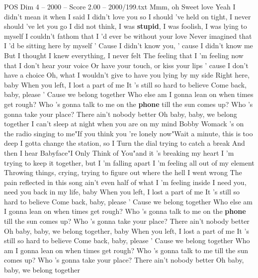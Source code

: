 \begin{textsample}{POS Dim 4 – 2000 – Score 2.00 – 2000/199.txt}  \label{ex:f4_pos_005}
Mmm, oh Sweet love Yeah I didn't mean it when I said I didn't love you so I should 've held on tight, I never should 've let you go I did not think, I was \textbf{stupid}, I was foolish, I was lying to myself I couldn't fathom that I 'd ever be without your love Never imagined that I 'd be sitting here by myself ' Cause I didn't know you, ' cause I didn't know me But I thought I knew everything, I never felt The feeling that I 'm feeling now that I don't hear your voice Or have your touch, or kiss your lips ' cause I don't have a choice Oh, what I wouldn't give to have you lying by my side Right here, baby When you left, I lost a part of me It 's still so hard to believe Come back, baby, please ' Cause we belong together Who else am I gonna lean on when times get rough?
Who 's gonna talk to me on the \textbf{phone} till the sun comes up?
Who 's gonna take your place?
There ain't nobody better Oh baby, baby, we belong together I can't sleep at night when you are on my mind Bobby Womack 's on the radio singing to me"If you think you 're lonely now"Wait a minute, this is too deep I gotta change the station, so I Turn the dial trying to catch a break And then I hear Babyface"I Only Think of You"and it 's breaking my heart I 'm trying to keep it together, but I 'm falling apart I 'm feeling all out of my element Throwing things, crying, trying to figure out where the hell I went wrong The pain reflected in this song ain't even half of what I 'm feeling inside I need you, need you back in my life, baby When you left, I lost a part of me It 's still so hard to believe Come back, baby, please ' Cause we belong together Who else am I gonna lean on when times get rough?
Who 's gonna talk to me on the \textbf{phone} till the sun comes up?
Who 's gonna take your place?
There ain't nobody better Oh baby, baby, we belong together, baby When you left, I lost a part of me It 's still so hard to believe Come back, baby, please ' Cause we belong together Who am I gonna lean on when times get rough?
Who 's gonna talk to me till the sun comes up?
Who 's gonna take your place?
There ain't nobody better Oh baby, baby, we belong together

\end{textsample}
